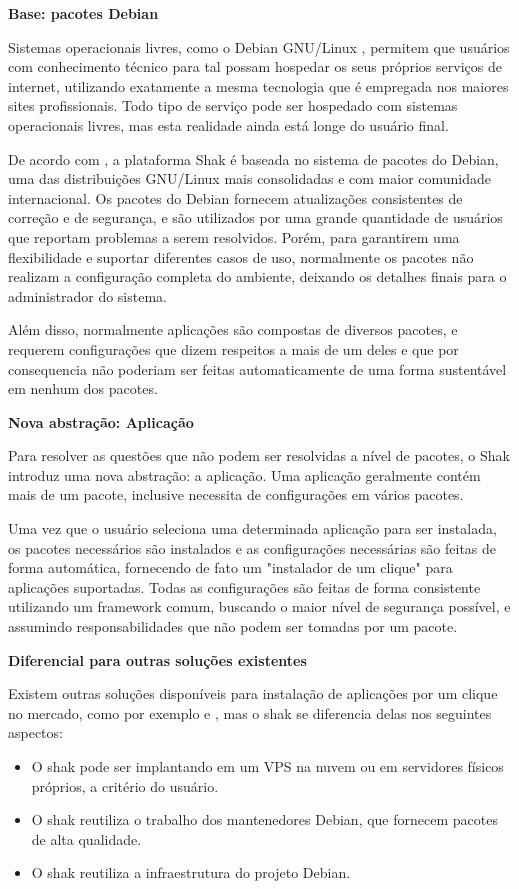 \textbf{Base: pacotes Debian}

Sistemas operacionais livres, como o Debian
GNU/Linux , permitem que usuários com conhecimento
técnico para tal possam hospedar os seus próprios serviços de internet,
utilizando exatamente a mesma tecnologia que é empregada nos maiores sites
profissionais. Todo tipo de serviço pode ser hospedado com sistemas
operacionais livres, mas esta realidade ainda está longe do usuário final.

De acordo com \cite{shak2015}, a plataforma Shak é baseada no sistema de pacotes
do Debian, uma das distribuições GNU/Linux mais consolidadas e com maior comunidade internacional. Os
pacotes do Debian fornecem atualizações consistentes de correção e de segurança,
e são utilizados por uma grande quantidade de usuários que reportam problemas a
serem resolvidos. Porém, para garantirem uma flexibilidade e suportar diferentes
casos de uso, normalmente os pacotes não realizam a configuração completa do ambiente,
deixando os detalhes finais para o administrador do sistema.

Além disso, normalmente aplicações são compostas de diversos pacotes, e
requerem configurações que dizem respeitos a mais de um deles e que por consequencia não poderiam ser
feitas automaticamente de uma forma sustentável em nenhum dos pacotes.

\textbf{Nova abstração: Aplicação}

Para resolver as questões que não podem ser resolvidas a nível de pacotes, o
Shak introduz uma nova abstração: a aplicação. Uma aplicação geralmente
contém mais de um pacote, inclusive necessita de configurações em vários pacotes.

Uma vez que o usuário seleciona uma determinada aplicação para
ser instalada, os pacotes necessários são instalados e as configurações
necessárias são feitas de forma automática, fornecendo de fato um "instalador
de um clique" para aplicações suportadas. Todas as configurações são feitas de
forma consistente utilizando um framework comum, buscando o maior nível de
segurança possível, e assumindo responsabilidades que não podem ser tomadas por
um pacote.

\textbf{Diferencial para outras soluções existentes}

Existem outras soluções disponíveis para instalação de aplicações por um clique no
mercado, como por exemplo \cite{bitnami} e \cite{sandstormio}, mas o shak se
diferencia delas nos seguintes aspectos:

\begin{itemize}
  \item O shak pode ser implantando em um VPS na nuvem ou em servidores físicos
    próprios, a critério do usuário.

  \item O shak reutiliza o trabalho dos mantenedores Debian, que fornecem pacotes
    de alta qualidade.

  \item O shak reutiliza a infraestrutura do projeto Debian.

\end{itemize}


